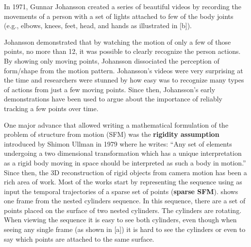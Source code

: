 
In 1971, Gunnar Johansson created a series of beautiful videos by recording the movements of a person with a set of lights attached to few of the body joints (e.g., elbows, knees, feet, head, and hands as illustrated in \fig{\ref{fig:demos_motivation_sfm}}[b]).


Johansson \cite{Johansson1973} demonstrated that by watching the motion of only a few of those points, no more than 12, it was possible to clearly recognize the person actions. By showing only moving points, Johansson dissociated the perception of form/shape from the motion pattern. Johansson's videos were very surprising at the time and researchers were stunned by how easy was to recognize many types of actions from just a few moving points.
Since then, Johansson's early demonstrations have been used to argue about the importance of reliably tracking a few points over time.









One major advance that allowed writing a mathematical formulation of the problem of structure from motion (SFM) was the {\bf rigidity assumption} introduced by Shimon Ullman in 1979 \cite{Ullman1979} where he writes: ``Any set of elements undergoing a two dimensional transformation which has a unique interpretation as a rigid body moving in space should be interpreted as such a body in motion.'' Since then, the 3D reconstruction of rigid objects from camera motion has been a rich area of work. Most of the works start by representing the sequence using as input the temporal trajectories of a sparse set of points ({\bf sparse SFM}).  shows one frame from the nested cylinders sequence. In this sequence, there are a set of points placed on the surface of two nested cylinders. The cylinders are rotating. When viewing the sequence it is easy to see both cylinders, even though when seeing any single frame (as shown in \fig{\ref{fig:demos_motivation_sfm}}[a]) it is hard to see the cylinders or even to say which points are attached to the same surface.

